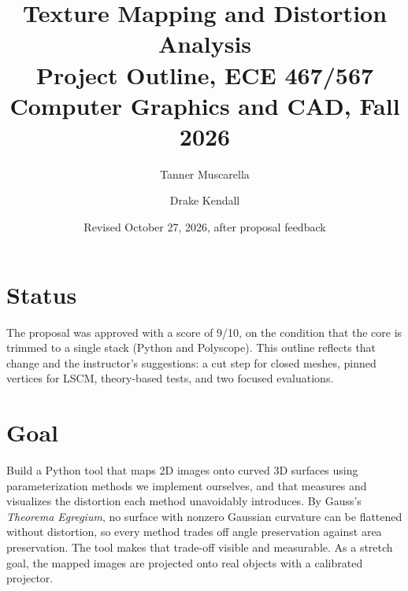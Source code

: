\documentclass[11pt]{article}
\title{Texture Mapping and Distortion Analysis\\[4pt]
\large Project Outline, ECE 467/567 Computer Graphics and CAD, Fall 2026}
\author{Tanner Muscarella \and Drake Kendall}
\date{Revised October 27, 2026, after proposal feedback}
\begin{document}
\maketitle

\section{Status}
The proposal was approved with a score of 9/10, on the condition that the core is trimmed to a single
stack (Python and Polyscope). This outline reflects that change and the instructor's suggestions:
a cut step for closed meshes, pinned vertices for LSCM, theory-based tests, and two focused evaluations.

\section{Goal}
Build a Python tool that maps 2D images onto curved 3D surfaces using parameterization methods we implement
ourselves, and that measures and visualizes the distortion each method unavoidably introduces. By Gauss's
\emph{Theorema Egregium}, no surface with nonzero Gaussian curvature can be flattened without distortion, so every
method trades off angle preservation against area preservation. The tool makes that trade-off visible and
measurable. As a stretch goal, the mapped images are projected onto real objects with a calibrated projector.
\end{document}
